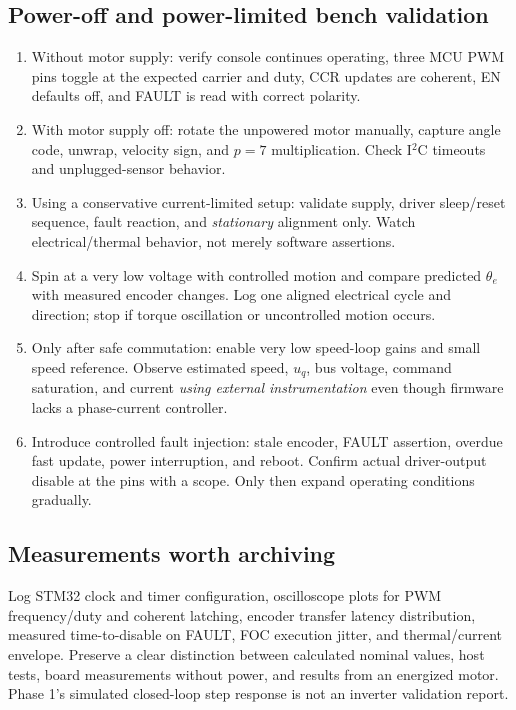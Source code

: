 \documentclass[10pt,letterpaper]{article}
\begin{document}
\subsection{Power-off and power-limited bench validation}
\begin{enumerate}
\item Without motor supply: verify console continues operating, three MCU PWM pins toggle at the expected carrier and duty, CCR updates are coherent, EN defaults off, and FAULT is read with correct polarity.
\item With motor supply off: rotate the unpowered motor manually, capture angle code, unwrap, velocity sign, and $p=7$ multiplication. Check I$^2$C timeouts and unplugged-sensor behavior.
\item Using a conservative current-limited setup: validate supply, driver sleep/reset sequence, fault reaction, and \emph{stationary} alignment only. Watch electrical/thermal behavior, not merely software assertions.
\item Spin at a very low voltage with controlled motion and compare predicted $\theta_e$ with measured encoder changes. Log one aligned electrical cycle and direction; stop if torque oscillation or uncontrolled motion occurs.
\item Only after safe commutation: enable very low speed-loop gains and small speed reference. Observe estimated speed, $u_q$, bus voltage, command saturation, and current \emph{using external instrumentation} even though firmware lacks a phase-current controller.
\item Introduce controlled fault injection: stale encoder, FAULT assertion, overdue fast update, power interruption, and reboot. Confirm actual driver-output disable at the pins with a scope. Only then expand operating conditions gradually.
\end{enumerate}
\subsection{Measurements worth archiving}
Log STM32 clock and timer configuration, oscilloscope plots for PWM frequency/duty and coherent latching, encoder transfer latency distribution, measured time-to-disable on FAULT, FOC execution jitter, and thermal/current envelope. Preserve a clear distinction between calculated nominal values, host tests, board measurements without power, and results from an energized motor. Phase 1's simulated closed-loop step response is not an inverter validation report.
\end{document}
